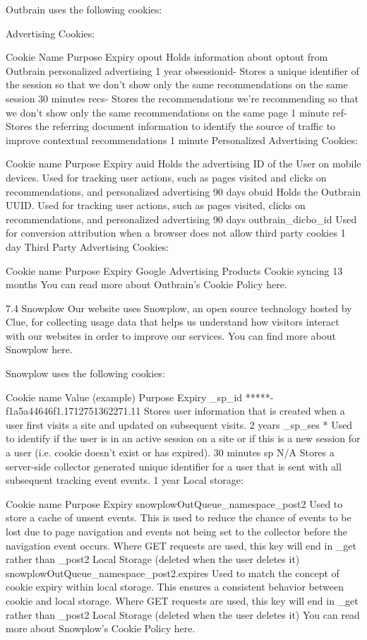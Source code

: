 Outbrain uses the following cookies:

Advertising Cookies:

Cookie Name	Purpose	Expiry
opout	Holds information about optout from Outbrain personalized advertising	1 year
obsessionid-{}	Stores a unique identifier of the session so that we don’t show only the same recommendations on the same session	30 minutes
recs-{}	Stores the recommendations we’re recommending so that we don’t show only the same recommendations on the same page	1 minute
ref-{}	Stores the referring document information to identify the source of traffic to improve contextual recommendations	1 minute
Personalized Advertising Cookies:

Cookie name	Purpose	Expiry
auid	Holds the advertising ID of the User on mobile devices. Used for tracking user actions, such as pages visited and clicks on recommendations, and personalized advertising	90 days
obuid	Holds the Outbrain UUID. Used for tracking user actions, such as pages visited, clicks on recommendations, and personalized advertising	90 days
outbrain_dicbo_id	Used for conversion attribution when a browser does not allow third party cookies 	1 day
Third Party Advertising Cookies:

Cookie name	Purpose	Expiry
Google Advertising Products	Cookie syncing	13 months
You can read more about Outbrain’s Cookie Policy here.

7.4 Snowplow
Our website uses Snowplow, an open source technology hosted by Clue, for collecting usage data that helps us understand how visitors interact with our websites in order to improve our services. You can find more about Snowplow here.

Snowplow uses the following cookies:

Cookie name	Value (example)	Purpose	Expiry
_sp_id	 *****-f1a5a44646f1.1712751362271.11	Stores user information that is created when a user first visits a site and updated on subsequent visits.	2 years
_sp_ses	*	Used to identify if the user is in an active session on a site or if this is a new session for a user (i.e. cookie doesn't exist or has expired). 	30 minutes
sp	N/A	Stores a server-side collector generated unique identifier for a user that is sent with all subsequent tracking event events.	1 year
Local storage:

Cookie name	Purpose	Expiry
snowplowOutQueue_{namespace}_post2 	Used to store a cache of unsent events. This is used to reduce the chance of events to be lost due to page navigation and events not being set to the collector before the navigation event occurs. Where GET requests are used, this key will end in _get rather than _post2	Local Storage (deleted when the user deletes it)
snowplowOutQueue_{namespace}_post2.expires	Used to match the concept of cookie expiry within local storage. This ensures a consistent behavior between cookie and local storage. Where GET requests are used, this key will end in _get rather than _post2	Local Storage (deleted when the user deletes it)
You can read more about Snowplow’s Cookie Policy here.

